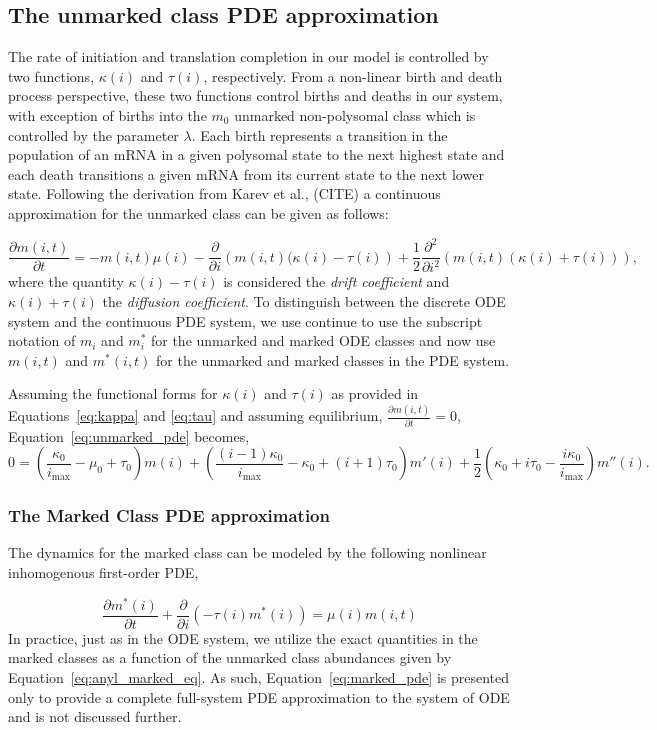 \documentclass[review]{elsarticle}
\newcommand{\imax}{\ensuremath{i_{\max}}\xspace}
\newcommand\p[2]{\frac{\partial #1}{\partial #2}}
\newcommand\ptwo[2]{\frac{\partial^2 #1}{\partial #2^2}}
\begin{document}
\subsection{The unmarked class PDE approximation}
The rate of initiation and translation completion in our model is controlled by two functions, $\kappa(i)$ and $\tau(i)$, respectively.
From a non-linear birth and death process perspective, these two functions control births and deaths in our system, with exception of births into the $m_0$ unmarked non-polysomal class which is controlled by the parameter $\lambda$.
Each birth represents a transition in the population of an mRNA in a given polysomal state to the next highest state and each death transitions a given mRNA from its current state to the next lower state.
Following the derivation from Karev et al., (CITE) a continuous approximation for the unmarked class can be given as follows:

\begin{equation}\label{eq:unmarked_pde}
\p{m(i,t)}{t}=-m(i,t)\mu(i)-\p{}{i}\left(m(i,t)(\kappa(i)-\tau(i)\right)+\frac{1}{2}\ptwo{}{i}\left(m(i,t)(\kappa(i)+\tau(i))\right),
\end{equation} where the quantity $\kappa(i)-\tau(i)$ is considered the \emph{drift coefficient} and $\kappa(i)+\tau(i)$ the \emph{diffusion coefficient}.
To distinguish between the discrete ODE system and the continuous PDE system, we use continue to use the subscript notation of $m_i$ and $m_i^*$ for the unmarked and marked ODE classes and now use $m(i,t)$ and $m^*(i,t)$ for the unmarked and marked classes in the PDE system.

Assuming the functional forms for $\kappa(i)$ and $\tau(i)$ as provided in Equations~\ref{eq:kappa} and \ref{eq:tau} and assuming equilibrium, $\p{m(i,t)}{t}=0$, Equation~\ref{eq:unmarked_pde} becomes,
\begin{equation}
0=\left(\frac{\kappa_0}{\imax}-\mu_0+\tau_0\right)m(i)+\left(\frac{(i-1)\kappa_0}{\imax}-\kappa_0+(i+1)\tau_0\right)m'(i)+\frac{1}{2}\left(\kappa_0+i\tau_0-\frac{i\kappa_0}{\imax}\right)m''(i).
\end{equation}
\subsubsection{The Marked Class PDE approximation}
The dynamics for the marked class can be modeled by the following nonlinear inhomogenous first-order PDE,

\begin{equation}\label{eq:marked_pde}
\frac{\partial m^*(i)}{\partial t}+\frac{\partial}{\partial i}\left(-\tau(i)m^*(i)\right)=\mu(i)m(i,t)
\end{equation}
In practice, just as in the ODE system, we utilize the exact quantities in the marked classes as a function of the unmarked class abundances given by Equation~\ref{eq:anyl_marked_eq}.
As such, Equation~\ref{eq:marked_pde} is presented only to provide a complete full-system PDE approximation to the system of ODE and is not discussed further.
\end{document}
